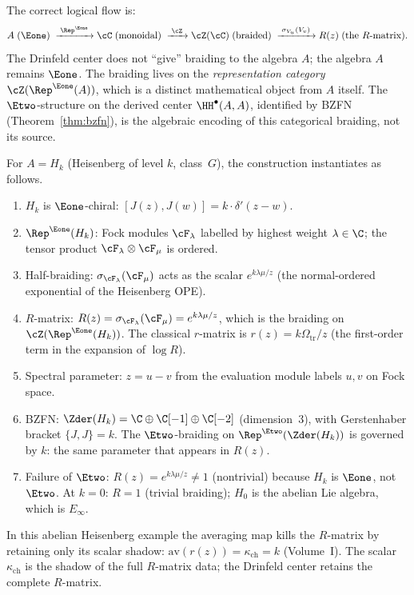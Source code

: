 \begin{remark}
\label{rem:arrow-of-explanation}
The correct logical flow is:
\[
 A \;\text{($\Eone$)}
 \;\xrightarrow{\;\Rep^{\Eone}\;}
 \cC \;\text{(monoidal)}
 \;\xrightarrow{\;\cZ\;}
 \cZ(\cC) \;\text{(braided)}
 \;\xrightarrow{\;\sigma_{V_u}(V_v)\;}
 R(z) \;\text{(the $R$-matrix)}.
\]
The Drinfeld center does not ``give'' braiding to the algebra
$A$; the algebra $A$ remains $\Eone$. The braiding lives on
the \emph{representation category} $\cZ(\Rep^{\Eone}(A))$,
which is a distinct mathematical object from $A$ itself.
The $\Etwo$-structure on the derived center $\HH^\bullet(A,A)$,
identified by BZFN (Theorem~\ref{thm:bzfn}), is the algebraic
encoding of this categorical braiding, not its source.
\end{remark}

\begin{example}
\label{ex:rmatrix-heisenberg-explicit}
For $A = H_k$ (Heisenberg of level $k$, class~$G$),
the construction instantiates as follows.
\begin{enumerate}[label=\textup{Arrow~\arabic*.},leftmargin=3.5em]
 \item $H_k$ is $\Eone$-chiral: $[J(z), J(w)] = k \cdot \delta'(z-w)$.
 \item $\Rep^{\Eone}(H_k)$: Fock modules $\cF_\lambda$
 labelled by highest weight $\lambda \in \C$; the tensor
 product $\cF_\lambda \otimes \cF_\mu$ is ordered.
 \item Half-braiding: $\sigma_{\cF_\lambda}(\cF_\mu)$ acts
 as the scalar $e^{k\lambda\mu / z}$ (the normal-ordered
 exponential of the Heisenberg OPE).
 \item $R$-matrix: $R(z) = \sigma_{\cF_\lambda}(\cF_\mu)
 = e^{k\lambda\mu / z}$, which is the braiding on
 $\cZ(\Rep^{\Eone}(H_k))$. The classical
 $r$-matrix is $r(z) = k\Omega_{\mathrm{tr}}/z$ (the first-order
 term in the expansion of $\log R$).
 \item Spectral parameter: $z = u - v$ from the evaluation
 module labels $u, v$ on Fock space.
 \item BZFN: $\Zder(H_k) = \C \oplus \C[-1] \oplus \C[-2]$
 (dimension~$3$), with Gerstenhaber bracket
 $\{J, J\} = k$. The $\Etwo$-braiding on
 $\Rep^{\Etwo}(\Zder(H_k))$ is governed by $k$:
 the same parameter that appears in $R(z)$.
 \item Failure of $\Etwo$: $R(z) = e^{k\lambda\mu/z} \neq 1$
 (nontrivial) because $H_k$ is $\Eone$, not $\Etwo$.
 At $k = 0$: $R = 1$ (trivial braiding); $H_0$ is
 the abelian Lie algebra, which is $E_\infty$.
\end{enumerate}
In this abelian Heisenberg example the averaging map kills the
$R$-matrix by retaining only its scalar shadow:
$\mathrm{av}(r(z)) = \kappa_{\mathrm{ch}} = k$
(Volume~I). The scalar $\kappa_{\mathrm{ch}}$ is the shadow
of the full $R$-matrix data; the Drinfeld center retains
the complete $R$-matrix.
\end{example}


